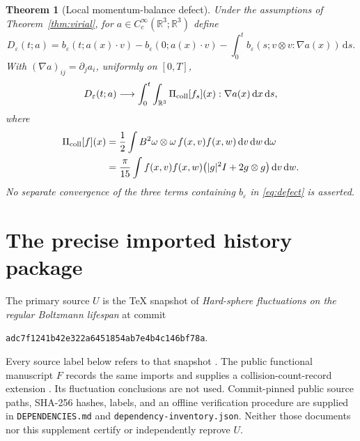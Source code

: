 \documentclass[11pt,letterpaper]{article}
\numberwithin{equation}{section}
\newtheorem{theorem}{Theorem}[section]
\theoremstyle{definition}\newtheorem{assumption}[theorem]{Assumption}
\theoremstyle{remark}\newtheorem{remark}[theorem]{Remark}
\newcommand{\R}{\mathbb R}\newcommand{\E}{\mathbb E}\newcommand{\Prob}{\mathbb P}
\newcommand{\eps}{\varepsilon}\newcommand{\dd}{\,\mathrm d}
\begin{document}
\begin{theorem}[Local momentum-balance defect]\label{thm:stress}
Under the assumptions of Theorem~\ref{thm:virial}, for $a\in C_c^\infty(\R^3;\R^3)$ define
\begin{equation}\label{eq:defect}
 D_\eps(t;a)=b_\eps(t;a(x)\cdot v)-b_\eps(0;a(x)\cdot v)
   -\int_0^t b_\eps(s;v\otimes v:\nabla a(x))\dd s.
\end{equation}
With $(\nabla a)_{ij}=\partial_j a_i$, uniformly on $[0,T]$,
\begin{equation}\label{eq:stress-limit}
 D_\eps(t;a)\longrightarrow
 \int_0^t\int_{\R^3}\Pcoll[f_s](x):\nabla a(x)\dd x\dd s,
\end{equation}
where
\begin{equation}\label{eq:stress-tensor}
 \begin{split}
 \Pcoll[f](x)
 &=\frac12\int B^2\omega\otimes\omega\,f(x,v)f(x,w)\dd v\dd w\dd\omega\\
 &=\frac{\pi}{15}\int f(x,v)f(x,w)
       \bigl(|g|^2I+2g\otimes g\bigr)\dd v\dd w.
 \end{split}
\end{equation}
No separate convergence of the three terms containing $b_\eps$ in \eqref{eq:defect} is asserted.
\end{theorem}

\section{The precise imported history package}\label{sec:imports}
The primary source $U$ is the TeX snapshot of \emph{Hard-sphere fluctuations on the regular Boltzmann lifespan} at commit
\begin{center}\small\texttt{adc7f1241b42e322a6451854ab7e4b4c146bf78a}.\end{center}
Every source label below refers to that snapshot \cite{U}. The public functional manuscript $F$ records the same imports and supplies a collision-count-record extension \cite{F}. Its fluctuation conclusions are not used. Commit-pinned public source paths, SHA-256 hashes, labels, and an offline verification procedure are supplied in \texttt{DEPENDENCIES.md} and \texttt{dependency-inventory.json}. Neither those documents nor this supplement certify or independently reprove $U$.
\end{document}
